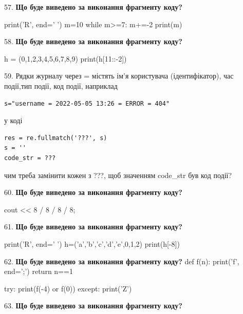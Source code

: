 \documentclass[11pt]{article}
\begin{document}
\par\vspace{5mm}

57. \textbf{Що буде виведено за виконання фрагменту коду?}

print('R', end=' ')
m=10
while m>=7:
    m+=-2
print(m)

\par\vspace{5mm}

58. \textbf{Що буде виведено за виконання фрагменту коду?}

h = (0,1,2,3,4,5,6,7,8,9)
print(h[11::-2])

\par\vspace{5mm}

59. 
Рядки журналу через = містять ім'я користувача (ідентифікатор), час події,тип події, код події, наприклад
\begin{verbatim}
s="username = 2022-05-05 13:26 = ERROR = 404"
\end{verbatim}
у коді 
\begin{verbatim}
res = re.fullmatch('???', s) 
s = ''
code_str = ??? 
\end{verbatim}
чим треба замінити кожен з ???, щоб значенням code\_str був код події? 


\par\vspace{5mm}

60. \textbf{Що буде виведено за виконання фрагменту коду?}

cout << 8 / 8 / 8 / 8;
\par\vspace{5mm}

61. \textbf{Що буде виведено за виконання фрагменту коду?}

print('R', end=' ')
h=('a','b','c','d','e',0,1,2)
print(h[-8])

\par\vspace{5mm}

62. \textbf{Що буде виведено за виконання фрагменту коду?}
def f(n):
    print('f', end=';')
    return n==1

try:
    print(f(-4) or f(0))
except:
    print('Z')
\par\vspace{5mm}

63. \textbf{Що буде виведено за виконання фрагменту коду?}
\end{document}
